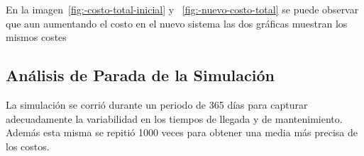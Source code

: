 En la imagen~\ref{fig:-costo-total-inicial} y ~\ref{fig:-nuevo-costo-total} se puede observar que aun aumentando el costo en el nuevo sistema las dos gráficas muestran los mismos costes

\subsection{Análisis de Parada de la Simulación}\label{subsec:analisis-de-parada-de-la-simulacion}


La simulación se corrió durante un periodo de 365 días para capturar adecuadamente la variabilidad en los tiempos de llegada y de mantenimiento.
Además esta misma se repitió 1000 veces para obtener una media más precisa de los costos.